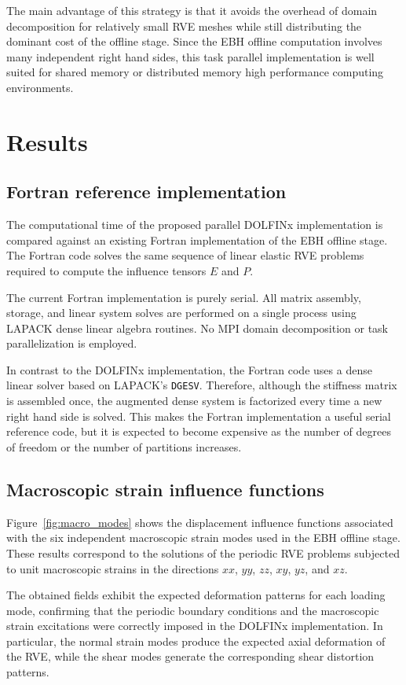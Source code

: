 \documentclass[12pt]{article}
\begin{document}
The main advantage of this strategy is that it avoids the overhead of domain decomposition for relatively small RVE meshes while still distributing the dominant cost of the offline stage. Since the EBH offline computation involves many independent right hand sides, this task parallel implementation is well suited for shared memory or distributed memory high performance computing environments.
\section{Results}
\subsection{Fortran reference implementation}

The computational time of the proposed parallel DOLFINx implementation is compared against an existing Fortran implementation of the EBH offline stage. The Fortran code solves the same sequence of linear elastic RVE problems required to compute the influence tensors $E$ and $P$. 

The current Fortran implementation is purely serial. All matrix assembly, storage, and linear system solves are performed on a single process using LAPACK dense linear algebra routines. No MPI domain decomposition or task parallelization is employed.

In contrast to the DOLFINx implementation, the Fortran code uses a dense linear solver based on LAPACK's \texttt{DGESV}. Therefore, although the stiffness matrix is assembled once, the augmented dense system is factorized every time a new right hand side is solved. This makes the Fortran implementation a useful serial reference code, but it is expected to become expensive as the number of degrees of freedom or the number of partitions increases.

\subsection{Macroscopic strain influence functions}

Figure~\ref{fig:macro_modes} shows the displacement influence functions associated with the six independent macroscopic strain modes used in the EBH offline stage. These results correspond to the solutions of the periodic RVE problems subjected to unit macroscopic strains in the directions $xx$, $yy$, $zz$, $xy$, $yz$, and $xz$.

The obtained fields exhibit the expected deformation patterns for each loading mode, confirming that the periodic boundary conditions and the macroscopic strain excitations were correctly imposed in the DOLFINx implementation. In particular, the normal strain modes produce the expected axial deformation of the RVE, while the shear modes generate the corresponding shear distortion patterns.
\end{document}
